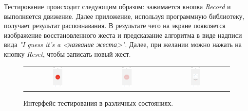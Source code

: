 Тестирование происходит следующим образом: зажимается кнопка \textit{Record} и выполняется движение. Далее приложение, используя программную библиотеку, получает результат распознавания. В результате чего на экране появляется изображение восстановленного жеста и предсказание алгоритма в виде надписи вида \textit{"I guess it's a <название жеста>"}. Далее, при желании можно нажать на кнопку \textit{Reset}, чтобы записать новый жест.
\begin{figure}[H]
    \begin{center}
        \begin{tabular}{ccc}
            \includegraphics[width=0.15\textwidth]{testingapp_screenshots/IMG_2011.PNG} & 
            \includegraphics[width=0.15\textwidth]{testingapp_screenshots/IMG_2016.PNG} & 
            \includegraphics[width=0.15\textwidth]{testingapp_screenshots/IMG_2017.PNG} \\
        \end{tabular}
    \end{center}
    \caption{Интерфейс тестирования в различных состояниях.}
\end{figure}

